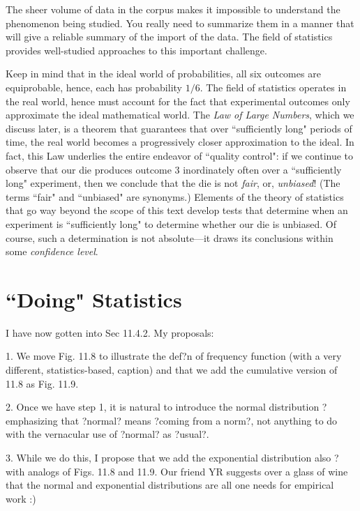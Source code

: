 \medskip
 
The sheer volume of data in the corpus makes it impossible to understand the phenomenon 
being studied.  You really need to summarize them 
in a manner that will give a reliable summary of the import of the data.  The field of statistics provides well-studied approaches to this important challenge.
 


  
Keep in mind that in the ideal world of probabilities, all six outcomes are equiprobable, hence, 
each has probability $1/6$.  The field of statistics operates in the real world, hence must 
account for the fact that experimental outcomes only approximate the ideal mathematical world.  
The {\it Law of Large Numbers}, which we discuss later, is a theorem that guarantees that over 
``sufficiently long" periods of time, the real world becomes a progressively closer approximation 
to the ideal. In fact, this Law underlies the entire endeavor of ``quality control": if we continue to 
observe that our die produces outcome $3$ inordinately often over a ``sufficiently long" 
experiment, then we conclude that the die is not {\em fair}, or, {\em unbiased}!  (The terms
``fair" and ``unbiased" are synonyms.) Elements of the theory of statistics that go way beyond 
the scope of this text develop tests that determine when an experiment is ``sufficiently long" to 
determine whether our die is unbiased.  Of course, such a determination is not absolute---it
draws its conclusions within some {\em confidence level}.



\section{``Doing" Statistics}
\label{sec:doing-statistics}


I have now gotten into Sec 11.4.2.  My proposals:

1. We move Fig. 11.8 to illustrate the def?n of frequency function (with a very different, statistics-based, caption) and that we add the cumulative version of 11.8 as Fig. 11.9.

2. Once we have step 1, it is natural to introduce the normal distribution ? emphasizing that ?normal? means ?coming from a norm?, not anything to do with the vernacular use of ?normal? as ?usual?.

3. While we do this, I propose that we add the exponential distribution also ? with analogs of Figs. 11.8 and 11.9.  Our friend YR suggests over a glass of wine that the normal and exponential distributions are all one needs for empirical work :)

